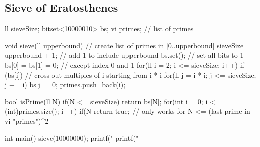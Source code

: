 \documentclass{article}
\begin{document}
\subsection{Sieve of Eratosthenes}
\begin{mylisting}{}
ll sieveSize;
bitset<10000010> bs;
vi primes; // list of primes

void sieve(ll upperbound){	// create list of primes in [0..upperbound]
	sieveSize = upperbound + 1;	// add 1 to include upperbound
	bs.set();	// set all bits to 1
	bs[0] = bs[1] = 0;	// except index 0 and 1
	for(ll i = 2; i <= sieveSize; i++) if (bs[i]){
		// cross out multiples of i starting from i * i
		for(ll j = i * i; j <= sieveSize; j += i) bs[j] = 0;
		primes.push_back(i);
}}
	
bool isPrime(ll N){	
	if(N <= sieveSize) return bs[N];
	for(int i = 0; i < (int)primes.size(); i++)
		if(N %
	return true;
}	// only works for N <= (last prime in vi "primes")^2

int main(){
	sieve(10000000);
	printf("%
	printf("%
}
\end{mylisting}
\end{document}
